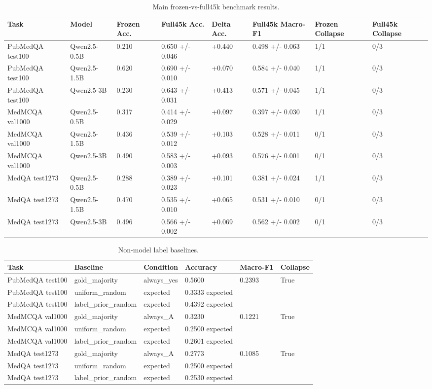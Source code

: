 \begin{table}[t]
\centering
\small
\caption{Main frozen-vs-full45k benchmark results.}
\label{tab:main\_results}
\begin{tabular}{llllllll}
\hline
Task & Model & Frozen Acc. & Full45k Acc. & Delta Acc. & Full45k Macro-F1 & Frozen Collapse & Full45k Collapse \\
\hline
PubMedQA test100 & Qwen2.5-0.5B & 0.210 & 0.650 +/- 0.046 & +0.440 & 0.498 +/- 0.063 & 1/1 & 0/3 \\
PubMedQA test100 & Qwen2.5-1.5B & 0.620 & 0.690 +/- 0.010 & +0.070 & 0.584 +/- 0.040 & 1/1 & 0/3 \\
PubMedQA test100 & Qwen2.5-3B & 0.230 & 0.643 +/- 0.031 & +0.413 & 0.571 +/- 0.045 & 1/1 & 0/3 \\
MedMCQA val1000 & Qwen2.5-0.5B & 0.317 & 0.414 +/- 0.029 & +0.097 & 0.397 +/- 0.030 & 1/1 & 0/3 \\
MedMCQA val1000 & Qwen2.5-1.5B & 0.436 & 0.539 +/- 0.012 & +0.103 & 0.528 +/- 0.011 & 0/1 & 0/3 \\
MedMCQA val1000 & Qwen2.5-3B & 0.490 & 0.583 +/- 0.003 & +0.093 & 0.576 +/- 0.001 & 0/1 & 0/3 \\
MedQA test1273 & Qwen2.5-0.5B & 0.288 & 0.389 +/- 0.023 & +0.101 & 0.381 +/- 0.024 & 1/1 & 0/3 \\
MedQA test1273 & Qwen2.5-1.5B & 0.470 & 0.535 +/- 0.010 & +0.065 & 0.531 +/- 0.010 & 0/1 & 0/3 \\
MedQA test1273 & Qwen2.5-3B & 0.496 & 0.566 +/- 0.002 & +0.069 & 0.562 +/- 0.002 & 0/1 & 0/3 \\
\hline
\end{tabular}
\end{table}

\begin{table}[t]
\centering
\small
\caption{Non-model label baselines.}
\label{tab:label\_baselines}
\begin{tabular}{llllll}
\hline
Task & Baseline & Condition & Accuracy & Macro-F1 & Collapse \\
\hline
PubMedQA test100 & gold\_majority & always\_yes & 0.5600 & 0.2393 & True \\
PubMedQA test100 & uniform\_random & expected & 0.3333 expected &  &  \\
PubMedQA test100 & label\_prior\_random & expected & 0.4392 expected &  &  \\
MedMCQA val1000 & gold\_majority & always\_A & 0.3230 & 0.1221 & True \\
MedMCQA val1000 & uniform\_random & expected & 0.2500 expected &  &  \\
MedMCQA val1000 & label\_prior\_random & expected & 0.2601 expected &  &  \\
MedQA test1273 & gold\_majority & always\_A & 0.2773 & 0.1085 & True \\
MedQA test1273 & uniform\_random & expected & 0.2500 expected &  &  \\
MedQA test1273 & label\_prior\_random & expected & 0.2530 expected &  &  \\
\hline
\end{tabular}
\end{table}

